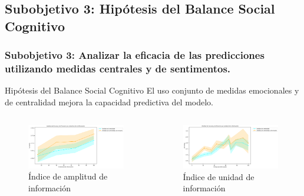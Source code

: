 \documentclass{beamer}
\begin{document}
\subsection{Subobjetivo 3: Hipótesis del Balance Social Cognitivo}
\begin{frame}
	\frametitle{Subobjetivo 3: Analizar la eficacia de las predicciones utilizando medidas centrales y de sentimentos.}
	\begin{block}{Hipótesis del Balance Social Cognitivo}
			El uso conjunto de medidas emocionales y de centralidad mejora la capacidad predictiva del modelo.
	\end{block}


			\begin{columns}[c]
		\begin{column}{.5\textwidth}
			\begin{figure}
				\centering
				\includegraphics[width=1\textwidth]{figs/cap7/figura_53}
\caption{Índice de amplitud de información}
			\end{figure}      
		\end{column}
		\begin{column}{.5\textwidth}
			\begin{figure}
				\centering
\includegraphics[width=1\textwidth]{figs/cap7/figura_54}
\caption{Índice de unidad de información}
			\end{figure}
		\end{column}
	\end{columns}
	
\end{frame}
\end{document}
